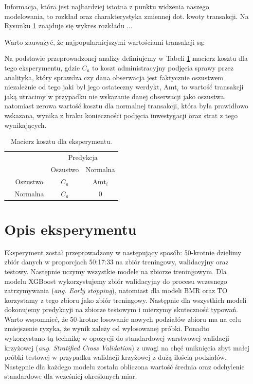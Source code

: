 \documentclass{book}
\begin{document}
	Informacja, która jest najbardziej istotna z punktu widzenia naszego modelowania, to rozkład oraz charakterystyka zmiennej dot. kwoty transakcji. Na Rysunku \ref{} znajduje się wykres rozkładu ... 
	
	Warto zauważyć, że najpopularniejszymi wartościami transakcji są: 
	
	Na podstawie przeprowadzonej analizy definiujemy w Tabeli \ref{macierz-kosztu-eksperyment} macierz kosztu dla tego eksperymentu, gdzie $C_a$ to koszt administracyjny podjęcia sprawy przez analityka, który sprawdza czy dana obserwacja jest faktycznie oszustwem niezależnie od tego jaki był jego ostateczny werdykt, $\text{Amt}_i$ to wartość transakcji jaką utracimy w przypadku nie wskazanie danej obserwacji jako oszustwa, natomiast zerowa wartość kosztu dla normalnej transakcji, która była prawidłowo wskazana, wynika z braku konieczności podjęcia inwestygacji oraz strat z tego wynikających.
	
	\begin{table}[h]
		\begin{center}
			\makegapedcells
			\begin{tabular}{cc|cc}
				\multicolumn{2}{c}{}     &   \multicolumn{2}{c}{Predykcja} \\
				&            &   Oszustwo &   Normalna     \\ 
				\cline{2-4}
				\multirow{2}{*}{\rotatebox[origin=c]{90}{Prawda}} & Oszustwo   & $C_a$         & $\text{Amt}_i$              \\
				& Normalna   & $C_a$         & $0$              \\ 
				\cline{2-4}
			\end{tabular}
		\end{center}
		\caption{Macierz kosztu dla eksperymentu.}
		\label{macierz-kosztu-eksperyment}
	\end{table}
	
\section{Opis eksperymentu}
	Eksperyment został przeprowadzony w następujący sposób:
	50-krotnie dzielimy zbiór danych w proporcjach 50:17:33 na zbiór treningowy, walidacyjny oraz testowy. Następnie uczymy wszystkie modele na zbiorze treningowym. Dla modelu XGBoost wykorzystujemy zbiór walidacyjny do procesu wczesnego zatrzymywania (\textit{ang. Early stopping}), natomiast dla modeli BMR oraz TO korzystamy z tego zbioru jako zbiór treningowy. Następnie dla wszystkich modeli dokonujemy predykcyji na zbiorze testowym i mierzymy skuteczność typowań. Warto wspomnieć, że 50-krotne losowanie nowych podziałów zbioru ma na celu zmiejszenie ryzyka, że wynik zależy od wylosowanej próbki. Ponadto wykorzystano tą technikę w opozycji do standardowej warstwowej walidacji krzyżowej (\textit{ang. Stratified Cross Validation}) z uwagi na chęć uniknięcia zbyt małej próbki testowej w przypadku walidacji krzyżowej z dużą ilością podziałów. Następnie dla każdego modelu została obliczona wartość średnia oraz odchylenie standardowe dla wcześniej określonych miar.
	
\end{document}
